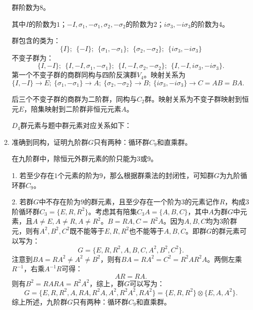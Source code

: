 \documentclass[reqno,a4paper,12pt]{amsart}
\begin{document}
\begin{enumerate}[1.]
\begin{tcolorbox}[breakable, colback = black!5!white, colframe = black]
群阶数为$8$。

其中$I$的阶数为$1$；$-I, \sigma_1, -\sigma_1, \sigma_2, -\sigma_2$的阶数为$2$；$i\sigma_3, -i\sigma_3$的阶数为$4$。

群包含的类为：
\[
	\{ I \}; \ \ \{ -I \}; \ \ \{ \sigma_1, -\sigma_1 \}; \ \ \{ \sigma_2, -\sigma_2 \}; \ \ \{ i\sigma_3, -i\sigma_3 \}
\]
不变子群为：
\[
	\{ I, -I \}; \ \ \{ I, -I, \sigma_1, -\sigma_1 \}; \ \ \{ I, -I, \sigma_2, -\sigma_2 \}; \ \ \{ I, -I, i\sigma_3, -i\sigma_3 \}.
\]
第一个不变子群的商群同构与四阶反演群$V_4$。映射关系为$\{I, -I\} \to E; \ \{\sigma_1, -\sigma_1\} \to A; \ \{\sigma_2, -\sigma_2\} \to B; \ \{i\sigma_3, -i\sigma_3\} \to C = AB = BA.$

后三个不变子群的商群为二阶群，同构与$C_2$群。映射关系为不变子群映射到恒元$E$，陪集映射到二阶群非恒元元素$A$。

$D_4$群元素与题中群元素对应关系如下：
\end{tcolorbox}

\item 准确到同构，证明九阶群$G$只有两种：循环群$C_9$和直乘群。
\begin{tcolorbox}[breakable, colback = black!5!white, colframe = black]
在九阶群中，除恒元外群元素的阶只能为$3$或$9$。

1. 若至少存在$1$个元素的阶为$9$，那么根据群乘法的封闭性，可知群$G$为九阶循环群$C_9$。

2. 若群$G$中不存在阶为$9$的群元素，且至少存在一个阶为$3$的元素记作$R$，构成$3$阶循环群$C_3 = \{E, R, R^2\}$。考虑其有陪集$C_3A = \{A, B, C\}$，其中$A$为群$G$中元素，且$A\neq E, A\neq R, A\neq R^2$。$B = RA, C = R^2 A$。因为$A,B,C$均为$3$阶群元，则有$A^2, B^2, C^2$既不能等于$E,R,R^2$也不能等于$A, B, C$。即群$G$的群元素可以写为：
\[
	G = \{E, R, R^2, A, B, C, A^2, B^2, C^2\}.
\]
注意到$BA = RA^2 \neq A^2 \neq B^2$，则有$BA = RA^2 = C^2 = R^2AR^2A$。两侧左乘$R^{-1}$，右乘$A^{-1}R$可得：
\[
	AR = RA.
\]
则有$B^2 = RARA = R^2A^2$，综上，群$G$可以写为：
\[
	G = \{ E, R, R^2, A, RA, R^2A, A^2, R^2A^2, RA^2\} = \{E,R,R^2\} \otimes \{E,A,A^2\}.
\]
综上所述，九阶群$G$只有两种：循环群$C_9$和直乘群。
\end{tcolorbox}


\end{enumerate}
\end{document}
